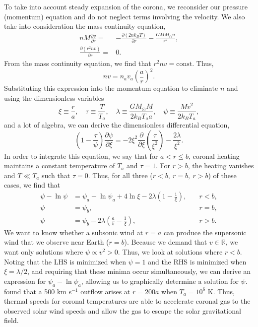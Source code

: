 	To take into account steady expansion of the corona, we reconsider our pressure (momentum) equation and do not neglect terms involving the velocity. We also take into consideration the mass continuity equation,
	\begin{align}
		nM\frac{\partial v}{\partial r} =& -\frac{\partial(2nk_BT)}{\partial r} - \frac{GMM_{\odot}n}{r^2}, \\
		\frac{\partial(r^2nv)}{\partial r} =& 0.
	\end{align}
	From the mass continuity equation, we find that $r^2nv=\text{const}$. Thus, 
	\begin{equation}
		nv = n_av_a\left(\frac{a}{r}\right)^2.
	\end{equation}
	Substituting this expression into the momentum equation to eliminate $n$ and using the dimensionless variables
	\begin{equation}
		\xi\equiv\frac{r}{a},\quad\tau\equiv\frac{T}{T_a},\quad\lambda\equiv\frac{GM_{\odot}M}{2k_BT_aa},\quad\psi\equiv\frac{Mv^2}{2k_BT_a},
	\end{equation}
	and a lot of algebra, we can derive the dimensionless differential equation,
	\begin{equation}
		\left(1 - \frac{\tau}{\psi}\right)\frac{\partial\psi}{\partial\xi} = -2\xi^2\frac{\partial}{\partial\xi}\left(\frac{\tau}{\xi^2}\right) - \frac{2\lambda}{\xi^2}.
	\end{equation}
	In order to integrate this equation, we say that for $a<r\le b$, coronal heating maintains a constant temperature of $T_a$ and $\tau=1$. For $r>b$, the heating vanishes and $T\ll T_a$ such that $\tau=0$. Thus, for all three ($r<b,~r=b,~r>b$) of these cases, we find that
	\begin{align}
		\psi - \ln{\psi} &= \psi_a - \ln{\psi_a} + 4\ln{\xi} - 2\lambda\left(1-\frac{1}{\xi}\right),&\quad r<b, \\
		\psi &= \psi_b,&\quad r=b, \\
		\psi &= \psi_b - 2\lambda(\frac{a}{b} - \frac{1}{\xi}),&\quad r>b.
	\end{align}
	We want to know whether a subsonic wind at $r=a$ can produce the supersonic wind that we observe near Earth ($r=b$). Because we demand that $v\in\mathbb{R}$, we want only solutions where $\psi\propto v^2 >0$. Thus, we look at solutions where $r<b$. Noting that the LHS is minimized when $\psi=1$ and the RHS is minimized when $\xi=\lambda/2$, and requiring that these minima occur simultaneously, we can derive an expression for $\psi_a-\ln{\psi_a}$, allowing us to graphically determine a solution for $\psi$. \citet{parker_dynamics_1958} found that a 500 km s$^{-1}$ outflow arises at $r=200a$ when $T_a=10^6$ K. Thus, thermal speeds for coronal temperatures are able to accelerate coronal gas to the observed solar wind speeds and allow the gas to escape the solar gravitational field. 
